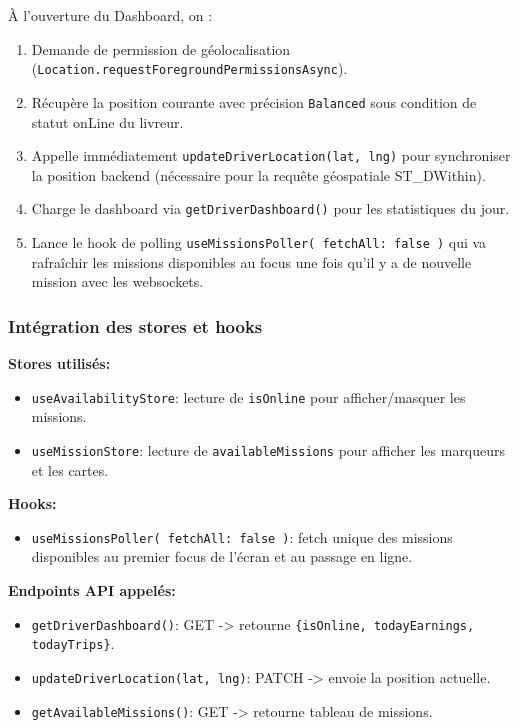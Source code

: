 À l'ouverture du Dashboard, on :
\begin{enumerate}
    \item Demande de permission de géolocalisation (\texttt{Location.requestForegroundPermissionsAsync}).
    \item Récupère la position courante avec précision \texttt{Balanced} sous condition de statut onLine du livreur.
    \item Appelle immédiatement \texttt{updateDriverLocation(lat, lng)} pour synchroniser la position backend (nécessaire pour la requête géospatiale ST\_DWithin).
    \item Charge le dashboard via \texttt{getDriverDashboard()} pour les statistiques du jour.
    \item Lance le hook de polling \texttt{useMissionsPoller({ fetchAll: false })} qui va rafraîchir les missions disponibles au focus une fois qu'il y a de nouvelle mission avec les websockets.
\end{enumerate}

\subsubsection{Intégration des stores et hooks}

\textbf{Stores utilisés:}
\begin{itemize}
    \item \texttt{useAvailabilityStore}: lecture de \texttt{isOnline} pour afficher/masquer les missions.
    \item \texttt{useMissionStore}: lecture de \texttt{availableMissions} pour afficher les marqueurs et les cartes.
\end{itemize}

\textbf{Hooks:}
\begin{itemize}
    \item \texttt{useMissionsPoller({ fetchAll: false })}: fetch unique des missions disponibles au premier focus de l'écran et au passage en ligne.
\end{itemize}

\textbf{Endpoints API appelés:}
\begin{itemize}
    \item \texttt{getDriverDashboard()}: GET  -> retourne \texttt{\{isOnline, todayEarnings, todayTrips\}}.
    \item \texttt{updateDriverLocation(lat, lng)}: PATCH  -> envoie la position actuelle.
    \item \texttt{getAvailableMissions()}: GET  -> retourne tableau de missions.
\end{itemize}

